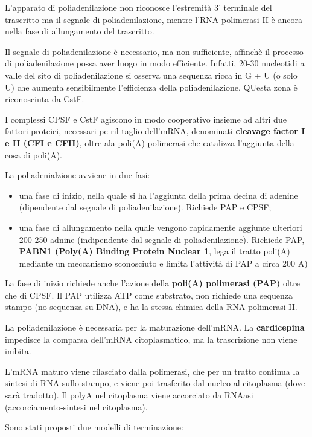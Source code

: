 \documentclass[11pt]{book}
\begin{document}
L'apparato di poliadenilazione non riconosce l'estremità 3' terminale
del trascritto ma il segnale di poliadenilazione, mentre l'RNA
polimerasi II è ancora nella fase di allungamento del trascritto.

Il segnale di poliadenilazione è necessario, ma non sufficiente,
affinchè il processo di poliadenilazione possa aver luogo in modo
efficiente. Infatti, 20-30 nucleotidi a valle del sito di
poliadenilazione si osserva una sequenza ricca in G + U (o solo U) che
aumenta sensibilmente l'efficienza della poliadenilazione. QUesta zona è
riconosciuta da CstF.

I complessi CPSF e CstF agiscono in modo cooperativo insieme ad altri
due fattori proteici, necessari pe ril taglio dell'mRNA, denominati
\textbf{cleavage factor I e II (CFI e CFII)}, oltre ala poli(A)
polimerasi che catalizza l'aggiunta della cosa di poli(A).

La poliadenialzione avviene in due fasi:

\begin{itemize}
\itemsep1pt\parskip0pt
\item
  una fase di inizio, nella quale si ha l'aggiunta della prima decina di
  adenine (dipendente dal segnale di poliadenilazione). Richiede PAP e
  CPSF;
\item
  una fase di allungamento nella quale vengono rapidamente aggiunte
  ulteriori 200-250 adnine (indipendente dal segnale di
  poliadenilazione). Richiede PAP, \textbf{PABN1 (Poly(A) Binding
  Protein Nuclear 1}, lega il tratto poli(A) mediante un meccanismo
  sconosciuto e limita l'attività di PAP a circa 200 A)
\end{itemize}

La fase di inizio richiede anche l'azione della \textbf{poli(A)
polimerasi (PAP)} oltre che di CPSF. Il PAP utilizza ATP come substrato,
non richiede una sequenza stampo (no sequenza su DNA), e ha la stessa
chimica della RNA polimerasi II.

La poliadenilazione è necessaria per la maturazione dell'mRNA. La
\textbf{cardicepina} impedisce la comparsa dell'mRNA citoplasmatico, ma
la trascrizione non viene inibita.

L'mRNA maturo viene rilasciato dalla polimerasi, che per un tratto
continua la sintesi di RNA sullo stampo, e viene poi trasferito dal
nucleo al citoplasma (dove sarà tradotto). Il polyA nel citoplasma viene
accorciato da RNAasi (accorciamento-sintesi nel citoplasma).

Sono stati proposti due modelli di terminazione:
\end{document}

